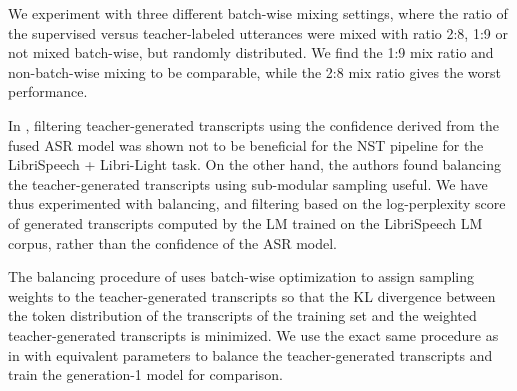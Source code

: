 \documentclass[dvipsnames]{article}
\begin{document}
\begin{table}[h!]
  \vskip -0.05in
  \caption{WERs(\%) from the generation-1 Conformer XL with different mix ratios and data processing policies. LM fusion has not been used.}
  \vskip 0.1in
  \label{t:finetuning}
  \centering
  \small
\end{table}

We experiment with three different batch-wise mixing settings, where the ratio of the supervised versus teacher-labeled utterances were mixed with ratio 2:8, 1:9 or not mixed batch-wise, but randomly distributed. We find the 1:9 mix ratio and non-batch-wise mixing to be comparable, while the 2:8 mix ratio gives the worst performance.

In \cite{nstasr}, filtering teacher-generated transcripts using the confidence derived from the fused ASR model was shown not to be beneficial for the NST pipeline for the LibriSpeech + Libri-Light task. On the other hand, the authors found balancing the teacher-generated transcripts using sub-modular sampling useful. We have thus experimented with balancing, and filtering based on the log-perplexity score of generated transcripts computed by the LM trained on the LibriSpeech LM corpus, rather than the confidence of the ASR model.

The balancing procedure of \cite{nstasr} uses batch-wise optimization to assign sampling weights to the teacher-generated transcripts so that the KL divergence between the token distribution of the transcripts of the training set and the weighted teacher-generated transcripts is minimized. We use the exact same procedure as in \cite{nstasr} with equivalent parameters to balance the teacher-generated transcripts and train the generation-1 model for comparison.
\end{document}
